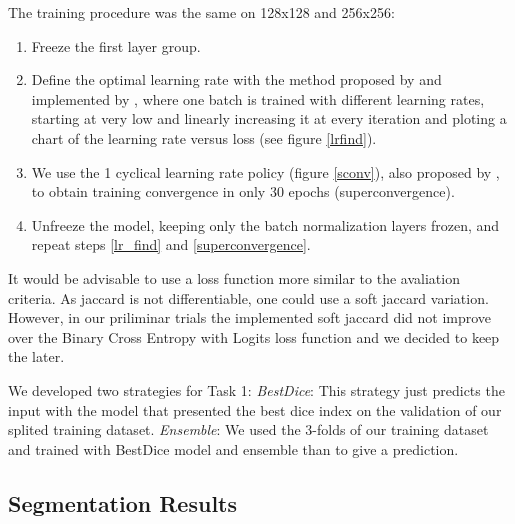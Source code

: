 \documentclass{article}
\begin{document}
The training procedure was the same on 128x128 and 256x256:
\begin{enumerate}
  \item Freeze the first layer group.
  \item \label{lr_find}Define the optimal learning rate with the method proposed by \cite{leslie} and implemented by \cite{fastai}, where one batch is trained with different learning rates, starting at very low and linearly increasing it at every iteration and ploting a chart of the learning rate versus loss (see figure \ref{lrfind}).
  \item \label{superconvergence}We use the 1 cyclical learning rate policy (figure \ref{sconv}), also proposed by \cite{leslie}, to obtain training convergence in only 30 epochs (superconvergence).
  \item Unfreeze the model, keeping only the batch normalization layers frozen, and repeat steps \ref{lr_find} and \ref{superconvergence}.
\end{enumerate}

It would be advisable to use a loss function more similar to the avaliation criteria. As jaccard is not differentiable, one could use a soft jaccard variation\cite{iglovikov}. However, in our priliminar trials the implemented soft jaccard did not improve over the Binary Cross Entropy with Logits loss function and we decided to keep the later. 

We developed two strategies for Task 1:
\emph{BestDice}: This strategy just predicts the input with the model that presented the best dice index on the validation of our splited training dataset. 
\emph{Ensemble}: We used the 3-folds of our training dataset and trained with BestDice model and ensemble than to give a prediction. 

\subsection{Segmentation Results}
\end{document}
